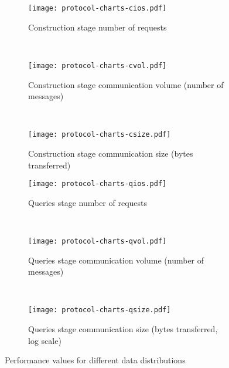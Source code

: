 \newlength{\hardcodedheight}
\newlength{\askip}
\newlength{\bskip}
\newlength{\blskip}

\setlength{\hardcodedheight}{135pt}
\setlength{\askip}{-10pt}
\setlength{\bskip}{0pt}
\setlength{\blskip}{-5pt}

\begin{figure*}[ht!]
	\captionsetup[subfigure]{justification=centering}
	\centering
	\begin{subfigure}[t]{0.333\textwidth}
		\centering
		\texttt{[image: protocol-charts-cios.pdf]}
		\setlength{\abovecaptionskip}{\askip}
		\setlength{\belowcaptionskip}{\bskip}
		\caption{Construction stage number of {\IO} requests}\label{fig:protocols:cios}
	\end{subfigure}%
	~ %
	\begin{subfigure}[t]{0.333\textwidth}
		\centering
		\texttt{[image: protocol-charts-cvol.pdf]}
		\setlength{\abovecaptionskip}{\askip}
		\setlength{\belowcaptionskip}{\bskip}
		\caption{Construction stage communication volume (number of messages)}\label{fig:protocols:cvol}
	\end{subfigure}%
	~ %
	\begin{subfigure}[t]{0.333\textwidth}
		\centering
		\texttt{[image: protocol-charts-csize.pdf]}
		\setlength{\abovecaptionskip}{\askip}
		\setlength{\belowcaptionskip}{\bskip}
		\caption{Construction stage communication size (bytes transferred)}\label{fig:protocols:csize}
	\end{subfigure}%

	\begin{subfigure}[t]{0.333\textwidth}
		\centering
		\texttt{[image: protocol-charts-qios.pdf]}
		\setlength{\abovecaptionskip}{\askip}
		\setlength{\belowcaptionskip}{\blskip}
		\caption{Queries stage number of {\IO} requests}\label{fig:protocols:qios}
	\end{subfigure}%
	~ %
	\begin{subfigure}[t]{0.333\textwidth}
		\centering
		\texttt{[image: protocol-charts-qvol.pdf]}
		\setlength{\abovecaptionskip}{\askip}
		\setlength{\belowcaptionskip}{\blskip}
		\caption{Queries stage communication volume (number of messages)}\label{fig:protocols:qvol}
	\end{subfigure}%
	~ %
	\begin{subfigure}[t]{0.333\textwidth}
		\centering
		\texttt{[image: protocol-charts-qsize.pdf]}
		\setlength{\abovecaptionskip}{\askip}
		\setlength{\belowcaptionskip}{\blskip}
		\caption{Queries stage communication size (bytes transferred, log scale)}\label{fig:protocols:qsize}
	\end{subfigure}%
	\caption{Performance values for different data distributions}\label{fig:protocols}
\end{figure*}
